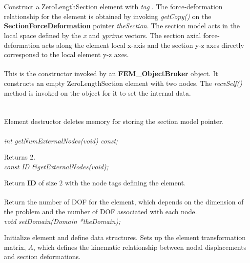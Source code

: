     


  \\
 \\
Construct a ZeroLengthSection element with {\em tag} .
The force-deformation relationship for the element is obtained by invoking
{\em getCopy()} on the {\bf SectionForceDeformation} pointer {\em theSection}.
The section model acts in the local space defined by the {\em x} and
{\em yprime} vectors. The section axial force-deformation acts along the 
element local x-axis and the section y-z axes directly corresponsd to the
local element y-z axes. \\

 \\ 
This is the constructor invoked by an {\bf FEM\_ObjectBroker} object. It
constructs an empty ZeroLengthSection element with two nodes.
The {\em recvSelf()} method is
invoked on the object for it to set the internal data. 
\\

 \\
 \\ 
Element destructor deletes memory for storing the section model pointer. 
\\

  \\
{\em    int getNumExternalNodes(void) const;} 

Returns 2.
\\

{\em    const ID \&getExternalNodes(void);} 

Return {\bf ID} of size $2$ with the node tags defining the element.
\\

 \\	
Return the number of DOF for the element, which depends on the dimension of the problem
and the number of DOF associated with each node.
\\

{\em    void setDomain(Domain *theDomain);} 

Initialize element and define data structures.  Sets up the element
transformation matrix, $A$, which defines the kinematic relationship between
nodal displacements and section deformations.
\\

